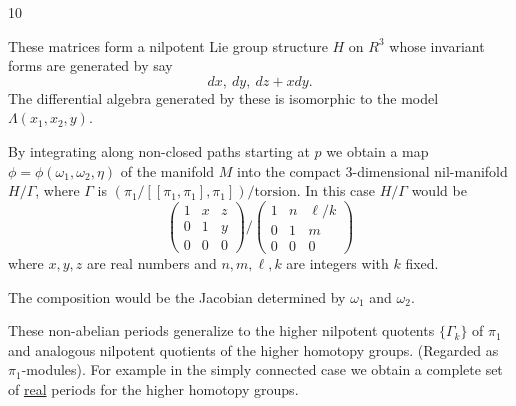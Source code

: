 \hfill 10

These matrices form a nilpotent Lie group structure $H$
on $R^3$ whose invariant forms are generated by say
\[
dx,\ dy,\ dz+xdy.
\]
The differential algebra generated by these is isomorphic
to the model $\Lambda(x_1,x_2,y)$.

By integrating along non-closed paths starting at
$p$ we obtain a map $\phi=\phi(\omega_1,\omega_2,\eta)$ of the manifold $M$
into the compact 3-dimensional nil-manifold $H/\Gamma$,
where $\Gamma$ is $(\pi_1/[[\pi_1,\pi_1],\pi_1])/\text{torsion}$. In this case
$H/\Gamma$ would be
\[
\begin{pmatrix}1&x&z\\0&1&y\\0&0&0\end{pmatrix}
\Big/\begin{pmatrix}1&n&\ell/k\\0&1&m\\0&0&0\end{pmatrix}
\]
where $x,y,z$ are real numbers and $n,m,\ell,k$ are integers
with $k$ fixed.

The composition
would be the Jacobian determined by $\omega_1$ and $\omega_2$.

These non-abelian periods generalize to the higher
nilpotent quotents $\{\Gamma_k\}$ of $\pi_1$ and analogous nilpotent
quotients of the higher homotopy groups. (Regarded as
$\pi_1$-modules). For example in the simply connected case
we obtain a complete set of \uline{real} periods for the higher
homotopy groups.

